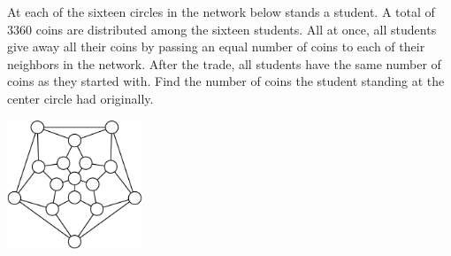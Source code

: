 At each of the sixteen circles in the network below stands a student. A total of 3360 coins are distributed among the sixteen students. All at once, all students give away all their coins by passing an equal number of coins to each of their neighbors in the network. After the trade, all students have the same number of coins as they started with. Find the number of coins the student standing at the center circle had originally.

\begin{center}
\includegraphics[width = 40.400000000000006mm]{img/fig0.png}
\end{center}